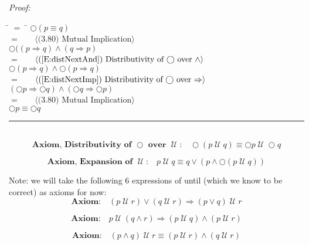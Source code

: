 \documentclass[fleqn, leqno]{article}
\newcommand{\lgap}{2pt}                             %
\newcommand{\mymathindent}{24pt}                      %
\newcommand{\until}{\;\mathcal{U}\;}
\newcommand{\next}{\bigcirc}
\newcommand{\myqed}{\hfill\rule[-.23ex]{1.2ex}{2.0ex}}
\newcommand{\Gll} {\langle}                         %
\newcommand{\Ggg} {\rangle}                         %
\newcommand{\Hint}[1]     {\ \ \ $\Gll              \mbox{#1} \Ggg$ }   %
\begin{document}
\emph{Proof:}
\begin{tabbing}
\hspace{\mymathindent} \= $= \;$ \= \kill
  \> \>   $\next (p \equiv q)$\\[\lgap]
  \> $=$  \>  \Hint{(3.80) Mutual Implication}\\[\lgap]
  \> \>   $\next ((p \Rightarrow q) \land (q \Rightarrow p)$\\[\lgap]
  \> $=$  \>  \Hint{(\ref{E:distNextAnd}) Distributivity of $\next$ over $\land$}\\[\lgap]
  \> \>   $\next (p \Rightarrow q) \land \next (p \Rightarrow q)$\\[\lgap]
  \> $=$  \>  \Hint{(\ref{E:distNextImp}) Distributivity of $\next$ over $\Rightarrow$}\\[\lgap]
  \> \>   $(\next p \Rightarrow \next q) \land (\next q \Rightarrow \next p)$\\[\lgap]
  \> $=$  \>  \Hint{(3.80) Mutual Implication}\\[\lgap]
  \> \>   $\next p \equiv \next q$
\end{tabbing}
\myqed\\[\lgap]


\begin{equation}\label{E:distNextUntil}
\textbf{Axiom, Distributivity of $\next$ over $\until$:}\quad \next (p \until q) \equiv \next p \until \next q
\end{equation}

\begin{equation}\label{E:expansionUntil}
\textbf{Axiom, Expansion of $\until$:}\quad p \until q \equiv q \lor (p \land \next (p \until q))
\end{equation}

Note: we will take the following 6 expressions of until (which we know to be correct) as axioms for now:\\

\begin{equation}\label{E:untilOrImp}
\textbf{Axiom:}\quad (p \until r) \lor (q \until r) \Rightarrow (p \lor q) \until r
\end{equation}

\begin{equation}\label{E:untilAndImp}
\textbf{Axiom:}\quad p \until (q \land r) \Rightarrow (p \until q) \land (p \until r)
\end{equation}

\begin{equation}\label{E:untilAndEquiv}
\textbf{Axiom:}\quad (p \land q) \until r \equiv (p \until r) \land (q \until r)
\end{equation}
\end{document}
